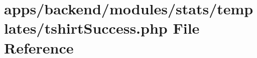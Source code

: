 \hypertarget{backend_2modules_2stats_2templates_2tshirt_success_8php}{\section{apps/backend/modules/stats/templates/tshirt\-Success.php File Reference}
\label{backend_2modules_2stats_2templates_2tshirt_success_8php}
}
